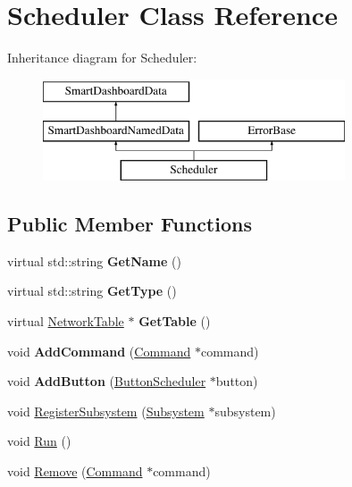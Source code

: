 \hypertarget{classScheduler}{
\section{Scheduler Class Reference}
\label{classScheduler}
}
Inheritance diagram for Scheduler:\begin{figure}[H]
\begin{center}
\leavevmode
\includegraphics[height=3.000000cm]{classScheduler}
\end{center}
\end{figure}
\subsection*{Public Member Functions}
\begin{DoxyCompactItemize}
\item 
\hypertarget{classScheduler_a9323d5cc1fbd858b82ea44b85d65ca7f}{
virtual std::string {\bfseries GetName} ()}
\label{classScheduler_a9323d5cc1fbd858b82ea44b85d65ca7f}

\item 
\hypertarget{classScheduler_ac438553a653fe439ac9764011610d9c8}{
virtual std::string {\bfseries GetType} ()}
\label{classScheduler_ac438553a653fe439ac9764011610d9c8}

\item 
\hypertarget{classScheduler_ac93630d9158c67a4f2f2e46b6a48b6e8}{
virtual \hyperlink{classNetworkTable}{NetworkTable} $\ast$ {\bfseries GetTable} ()}
\label{classScheduler_ac93630d9158c67a4f2f2e46b6a48b6e8}

\item 
\hypertarget{classScheduler_a748d4035dafc39002b7f03a4504d3150}{
void {\bfseries AddCommand} (\hyperlink{classCommand}{Command} $\ast$command)}
\label{classScheduler_a748d4035dafc39002b7f03a4504d3150}

\item 
\hypertarget{classScheduler_a5ee42f6fbe43cd34cf463be23107a079}{
void {\bfseries AddButton} (\hyperlink{classButtonScheduler}{ButtonScheduler} $\ast$button)}
\label{classScheduler_a5ee42f6fbe43cd34cf463be23107a079}

\item 
void \hyperlink{classScheduler_a639c534a0655c5ab230046669e5aa081}{RegisterSubsystem} (\hyperlink{classSubsystem}{Subsystem} $\ast$subsystem)
\item 
void \hyperlink{classScheduler_a6e17233143754873d7f29860047de2c1}{Run} ()
\item 
void \hyperlink{classScheduler_a5fd987a5f7a9ba180207a1289a7bd477}{Remove} (\hyperlink{classCommand}{Command} $\ast$command)
\end{DoxyCompactItemize}
